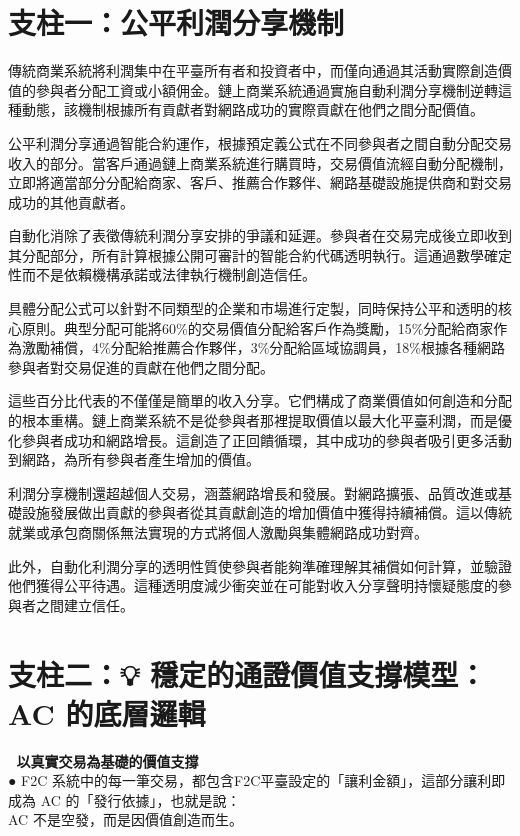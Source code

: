 \documentclass[
  Letterpaper,
]{scrbook}
\begin{document}
\section{支柱一：公平利潤分享機制}\label{ux652fux67f1ux4e00ux516cux5e73ux5229ux6f64ux5206ux4eabux6a5fux5236}

傳統商業系統將利潤集中在平臺所有者和投資者中，而僅向通過其活動實際創造價值的參與者分配工資或小額佣金。鏈上商業系統通過實施自動利潤分享機制逆轉這種動態，該機制根據所有貢獻者對網路成功的實際貢獻在他們之間分配價值。

公平利潤分享通過智能合約運作，根據預定義公式在不同參與者之間自動分配交易收入的部分。當客戶通過鏈上商業系統進行購買時，交易價值流經自動分配機制，立即將適當部分分配給商家、客戶、推薦合作夥伴、網路基礎設施提供商和對交易成功的其他貢獻者。

自動化消除了表徵傳統利潤分享安排的爭議和延遲。參與者在交易完成後立即收到其分配部分，所有計算根據公開可審計的智能合約代碼透明執行。這通過數學確定性而不是依賴機構承諾或法律執行機制創造信任。

具體分配公式可以針對不同類型的企業和市場進行定製，同時保持公平和透明的核心原則。典型分配可能將60\%的交易價值分配給客戶作為獎勵，15\%分配給商家作為激勵補償，4\%分配給推薦合作夥伴，3\%分配給區域協調員，18\%根據各種網路參與者對交易促進的貢獻在他們之間分配。

這些百分比代表的不僅僅是簡單的收入分享。它們構成了商業價值如何創造和分配的根本重構。鏈上商業系統不是從參與者那裡提取價值以最大化平臺利潤，而是優化參與者成功和網路增長。這創造了正回饋循環，其中成功的參與者吸引更多活動到網路，為所有參與者產生增加的價值。

利潤分享機制還超越個人交易，涵蓋網路增長和發展。對網路擴張、品質改進或基礎設施發展做出貢獻的參與者從其貢獻創造的增加價值中獲得持續補償。這以傳統就業或承包商關係無法實現的方式將個人激勵與集體網路成功對齊。

此外，自動化利潤分享的透明性質使參與者能夠準確理解其補償如何計算，並驗證他們獲得公平待遇。這種透明度減少衝突並在可能對收入分享聲明持懷疑態度的參與者之間建立信任。

\section{支柱二：💡 穩定的通證價值支撐模型：AC
的底層邏輯}\label{ux652fux67f1ux4e8c-ux7a69ux5b9aux7684ux901aux8b49ux50f9ux503cux652fux6490ux6a21ux578bac-ux7684ux5e95ux5c64ux908fux8f2f}

🔄 \textbf{以真實交易為基礎的價值支撐}\\
● F2C
系統中的每一筆交易，都包含F2C平臺設定的「讓利金額」，這部分讓利即成為 AC
的「發行依據」，也就是說：\\
AC 不是空發，而是因價值創造而生。
\end{document}
